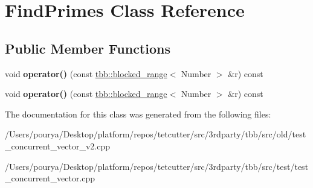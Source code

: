 \hypertarget{classFindPrimes}{}\section{Find\+Primes Class Reference}
\label{classFindPrimes}
\subsection*{Public Member Functions}
\begin{DoxyCompactItemize}
\item 
\hypertarget{classFindPrimes_a56e0419ad32de6d36e4e7beb256ad3ff}{}void {\bfseries operator()} (const \hyperlink{classtbb_1_1blocked__range}{tbb\+::blocked\+\_\+range}$<$ Number $>$ \&r) const \label{classFindPrimes_a56e0419ad32de6d36e4e7beb256ad3ff}

\item 
\hypertarget{classFindPrimes_a56e0419ad32de6d36e4e7beb256ad3ff}{}void {\bfseries operator()} (const \hyperlink{classtbb_1_1blocked__range}{tbb\+::blocked\+\_\+range}$<$ Number $>$ \&r) const \label{classFindPrimes_a56e0419ad32de6d36e4e7beb256ad3ff}

\end{DoxyCompactItemize}


The documentation for this class was generated from the following files\+:\begin{DoxyCompactItemize}
\item 
/\+Users/pourya/\+Desktop/platform/repos/tetcutter/src/3rdparty/tbb/src/old/test\+\_\+concurrent\+\_\+vector\+\_\+v2.\+cpp\item 
/\+Users/pourya/\+Desktop/platform/repos/tetcutter/src/3rdparty/tbb/src/test/test\+\_\+concurrent\+\_\+vector.\+cpp\end{DoxyCompactItemize}
